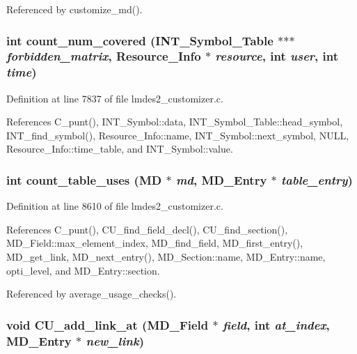Referenced by customize\_\-md().
\subsubsection{\setlength{\rightskip}{0pt plus 5cm}int count\_\-num\_\-covered (\bf{INT\_\-Symbol\_\-Table} $\ast$$\ast$$\ast$ {\em forbidden\_\-matrix}, \bf{Resource\_\-Info} $\ast$ {\em resource}, int {\em user}, int {\em time})}\label{lmdes2__customizer_8c_ab8af320e914a5226e613527f8e57a63}




Definition at line 7837 of file lmdes2\_\-customizer.c.

References C\_\-punt(), INT\_\-Symbol::data, INT\_\-Symbol\_\-Table::head\_\-symbol, INT\_\-find\_\-symbol(), Resource\_\-Info::name, INT\_\-Symbol::next\_\-symbol, NULL, Resource\_\-Info::time\_\-table, and INT\_\-Symbol::value.
\subsubsection{\setlength{\rightskip}{0pt plus 5cm}int count\_\-table\_\-uses (\bf{MD} $\ast$ {\em md}, \bf{MD\_\-Entry} $\ast$ {\em table\_\-entry})}\label{lmdes2__customizer_8c_4ce135688fc954521f1946964d6d3025}




Definition at line 8610 of file lmdes2\_\-customizer.c.

References C\_\-punt(), CU\_\-find\_\-field\_\-decl(), CU\_\-find\_\-section(), MD\_\-Field::max\_\-element\_\-index, MD\_\-find\_\-field, MD\_\-first\_\-entry(), MD\_\-get\_\-link, MD\_\-next\_\-entry(), MD\_\-Section::name, MD\_\-Entry::name, opti\_\-level, and MD\_\-Entry::section.

Referenced by average\_\-usage\_\-checks().
\subsubsection{\setlength{\rightskip}{0pt plus 5cm}void CU\_\-add\_\-link\_\-at (\bf{MD\_\-Field} $\ast$ {\em field}, int {\em at\_\-index}, \bf{MD\_\-Entry} $\ast$ {\em new\_\-link})}\label{lmdes2__customizer_8c_6654d07ff1321b2e08dfd348ff1e3e2b}




